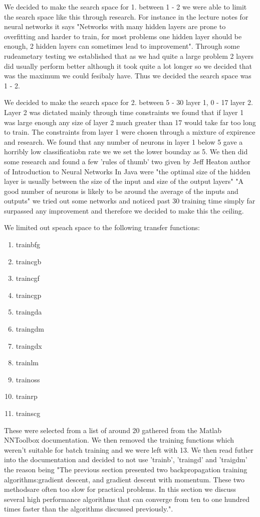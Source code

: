 \documentclass[11pt]{article}
\begin{document}
We decided to make the search space for 1. between 1 - 2 we were able to limit the search space like this through research. For instance in the lecture notes for neural networks it says "Networks with many hidden layers are prone to overfitting and harder to train, for most problems one hidden layer should be enough, 2 hidden layers can sometimes lead to improvement". Through some
rudeametary testing we established that as we had quite a large problem 2 layers did usually perform better although it took
quite a lot longer so we decided that was the maximum we could fesibaly have. Thus we decided the search space was 1 - 2.

We decided to make the search space for 2. between 5 - 30 layer 1, 0 - 17 layer 2. Layer 2 was dictated mainly through time
constraints we found that if layer 1 was large enough any size of layer 2 much greater than 17 would take far too long to train.
The constraints from layer 1 were chosen through a mixture of expirence and research. We found that any number of neurons in layer
1 below 5 gave a horribly low classificatiobn rate we we set the lower bounday as 5. We then did some research and found a few 'rules of thumb' two given by Jeff Heaton author of Introduction to Neural Networks In Java were "the optimal size of the hidden layer is usually between the size of the input and size of the output layers" "A good number of neurons is likely to be around the average of the inputs and outputs" we tried out some networks and noticed past 30 training time simply far surpassed any improvement and therefore we decided to make this the ceiling.

We limited out speach space to the following transfer functions:
\begin{enumerate}
  \item trainbfg
  \item traincgb
  \item traincgf
  \item traincgp
  \item traingda
  \item traingdm
  \item traingdx
  \item trainlm
  \item trainoss
  \item trainrp
  \item trainscg 
\end{enumerate}

These were selected from a list of around 20 gathered from the Matlab NNToolbox documentation. We then removed the training functions which weren't suitable for batch training and we were left with 13. We then read futher into the documentation and decided to not use 'trainb', 'traingd' and 'traigdm' the reason being "The previous section presented two backpropagation training algorithms:gradient descent, and gradient descent with momentum. These two methodsare often too slow for practical problems. In this section we discuss several high performance algorithms that can converge from ten to one hundred times faster than the algorithms discussed previously.".
\end{document}
